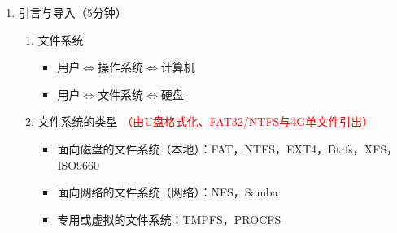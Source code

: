 \documentclass{TIJMUjiaoanLL}
\begin{document}

\firstTail


\newpage
\otherHeader

\begin{enumerate}
  \item 引言与导入（5分钟）
    \begin{enumerate}
      \item 文件系统
	\begin{itemize}
	  \item 用户$\Leftrightarrow$操作系统$\Leftrightarrow$计算机
	  \item 用户$\Leftrightarrow$文件系统$\Leftrightarrow$硬盘
	\end{itemize}
      \item 文件系统的类型 \textcolor{red}{（由U盘格式化、FAT32/NTFS与4G单文件引出）}
	\begin{itemize}
	  \item 面向磁盘的文件系统（本地）：FAT，NTFS，EXT4，Btrfs，XFS，ISO9660
	  \item 面向网络的文件系统（网络）：NFS，Samba
	  \item 专用或虚拟的文件系统：TMPFS，PROCFS
	\end{itemize}
    \end{enumerate}



\end{enumerate}
\end{document}
